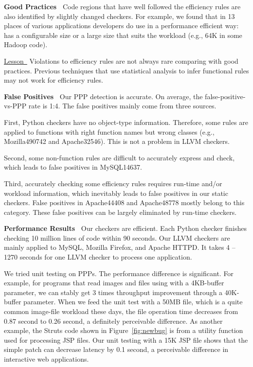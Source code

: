 \vspace{0.05in}
{\bf Good Practices\ }
Code regions that have well followed the efficiency rules are also identified
by slightly changed checkers.
For example, we found that in 13 places of various applications 
developers do use 
 in a performance efficient
way:  has a configurable size or 
a large size that suits the workload (e.g., 64K in some Hadoop code).

\underline{Lesson\ } Violations to efficiency rules are not 
always rare comparing with good practices. 
Previous techniques that use statistical analysis to
infer functional rules \citep{PRMiner05,engler01bugs} 
may not work for efficiency rules.

{\bf False Positives\ }
Our PPP detection is accurate. 
On average, the false-positive-vs-PPP rate is 1:4.
The false positives mainly come from three sources.

First, Python checkers have no object-type information.
Therefore, some rules are applied to functions
with right function names but wrong classes
(e.g., Mozilla490742 and 
Apache32546). This is not a problem in LLVM checkers.

Second, some non-function rules are difficult to 
accurately express and check, which leads to false positives in
MySQL14637.

Third, accurately checking some efficiency rules requires run-time and/or 
workload information, which inevitably leads to false positives in
our static checkers. 
False positives in Apache44408 and Apache48778 mostly belong to this 
category. These false positives can be largely eliminated by
run-time checkers.

{\bf Performance Results\ }
Our checkers are efficient. Each Python checker finishes
checking 10 million lines of code within 90 seconds.
Our LLVM checkers are mainly applied to 
MySQL, Mozilla Firefox, and Apache HTTPD.
It takes 4 -- 1270 seconds for one LLVM
checker to process one application.

We tried unit testing on PPPs.
The performance difference is significant. 
For example, for programs that read images and files using
 with a 4KB-buffer parameter,
we can stably get 3 times throughput improvement through a 40K-buffer parameter.
When we feed the unit test with a 50MB file, which is a quite common image-file
workload these days,
the file operation time decreases from 0.87 second to 0.26 second,
a definitely perceivable difference.
As another example, the Struts code shown in Figure~\ref{fig:newbug}
is from a utility function used for processing JSP files. 
Our unit testing with a 15K JSP 
file shows that the simple patch can decrease latency by 0.1 second, 
a perceivable difference in interactive web applications.

